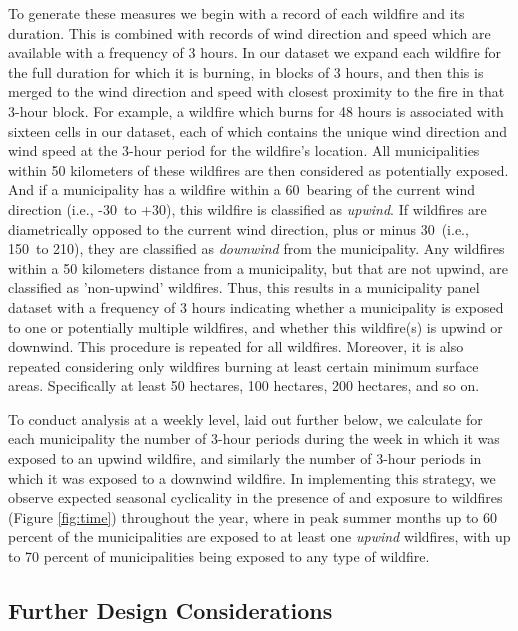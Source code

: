 \documentclass[11pt]{article}
\begin{document}
\begin{spacing}{1.5}
To generate these measures we begin with a record of each wildfire and its duration. This is combined with records of wind direction and speed which are available with a frequency of 3 hours. In our dataset we expand each wildfire for the full duration for which it is burning, in blocks of 3 hours, and then this is merged to the wind direction and speed with closest proximity to the fire in that 3-hour block.  For example, a wildfire which burns for 48 hours is associated with sixteen cells in our dataset, each of which contains the unique wind direction and wind speed at the 3-hour period for the wildfire's location.  All municipalities within 50 kilometers of these wildfires are then considered as potentially exposed. And if a municipality has a wildfire within a 60\textdegree\ bearing of the current wind direction (i.e., -30\textdegree\ to +30\textdegree), this wildfire is classified as \textit{upwind}.  If wildfires are diametrically opposed to the current wind direction, plus or minus 30\textdegree\ (i.e., 150\textdegree\ to 210\textdegree), they are classified as \textit{downwind} from the municipality.  Any wildfires within a 50 kilometers distance from a municipality,  but that are not upwind, are classified as 'non-upwind' wildfires.  Thus, this results in a municipality panel dataset with a frequency of 3 hours indicating whether a municipality is exposed to one or potentially multiple wildfires, and whether this wildfire(s) is upwind or downwind. This procedure is repeated for all wildfires. Moreover, it is also repeated considering only wildfires burning at least certain minimum surface areas. Specifically at least 50 hectares, 100 hectares, 200 hectares, and so on.  

To conduct analysis at a weekly level, laid out further below, we calculate for each municipality the number of 3-hour periods during the week in which it was exposed to an upwind wildfire, and similarly the number of 3-hour periods in which it was exposed to a downwind wildfire.  In implementing this strategy, we observe expected seasonal cyclicality in the presence of and exposure to wildfires (Figure \ref{fig:time}) throughout the year, where in peak summer months up to 60 percent of the municipalities are exposed to at least one \textit{upwind} wildfires, with up to 70 percent of municipalities being exposed to any type of wildfire. 



\subsection{Further Design Considerations}
\label{sscn:Outcomes_design}


\end{spacing}
\end{document}
